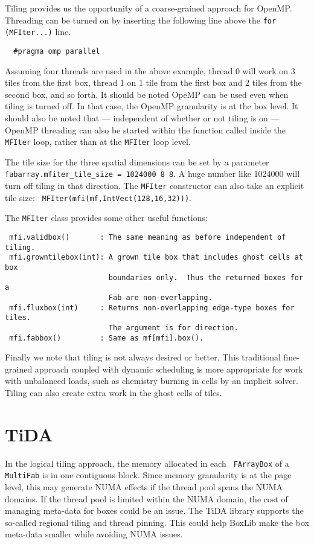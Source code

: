Tiling provides us the opportunity of a coarse-grained approach for
OpenMP.  Threading can be turned on by inserting the following line
above the {\tt for (MFIter...)} line.
\begin{lstlisting}
  #pragma omp parallel
\end{lstlisting}
Assuming four threads are used in the above example, thread 0 will
work on 3 tiles from the first box, thread 1 on 1 tile from the first
box and 2 tiles from the second box, and so forth.  It should be noted
OpeMP can be used even when tiling is turned off.  In that case, the
OpenMP granularity is at the box level.  It should also be noted that
--- independent of whether or not tiling is on --- OpenMP threading
can also be started within the function called inside the {\tt MFIter}
loop, rather than at the {\tt MFIter} loop level.

The tile size for the three spatial dimensions can be set by a parameter
{\tt fabarray.mfiter\_tile\_size = 1024000 8 8}.  A huge number like
1024000 will turn off tiling in that direction.  The {\tt MFIter}
constructor can also take an explicit tile size: {\tt
  MFIter(mfi(mf,IntVect(128,16,32)))}. 

The {\tt MFIter} class provides some other useful functions:
\begin{lstlisting}
 mfi.validbox()       : The same meaning as before independent of tiling.
 mfi.growntilebox(int): A grown tile box that includes ghost cells at box
                        boundaries only.  Thus the returned boxes for a
                        Fab are non-overlapping.
 mfi.fluxbox(int)     : Returns non-overlapping edge-type boxes for tiles.
                        The argument is for direction.
 mfi.fabbox()         : Same as mf[mfi].box().
\end{lstlisting}

Finally we note that tiling is not always desired or better.  This
traditional fine-grained approach coupled with dynamic scheduling is
more appropriate for work with unbalanced loads, such as chemistry
burning in cells by an implicit solver.  Tiling can also create extra
work in the ghost cells of tiles.

\section{TiDA}
\label{sec:tida}

In the logical tiling approach, the memory allocated in each {\tt
  FArrayBox} of a {\tt MultiFab} is in one contiguous block.  Since
memory granularity is at the page level, this may generate NUMA
effects if the thread pool spans the NUMA domains.  If the thread pool
is limited within the NUMA domain, the cost of managing meta-data for
boxes could be an issue.  The TiDA library supports the so-called
regional tiling and thread pinning.  This could help BoxLib make the
box meta-data smaller while avoiding NUMA issues.

